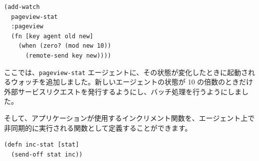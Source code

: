 \begin{lstlisting}[numbers=none]
(add-watch
  pageview-stat
  :pageview
  (fn [key agent old new]
    (when (zero? (mod new 10))
      (remote-send key new))))
\end{lstlisting}

ここでは、\texttt{pageview-stat} エージェントに、その状態が変化したときに起動されるウォッチを追加しました。新しいエージェントの状態が 10 の倍数のときだけ外部サービスリクエストを発行するようにし、バッチ処理を行うようにしました。

そして、アプリケーションが使用するインクリメント関数を、エージェント上で非同期的に実行される関数として定義することができます。


\begin{lstlisting}[numbers=none]
(defn inc-stat [stat]
  (send-off stat inc))
\end{lstlisting}





